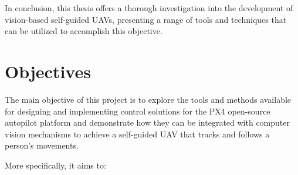 In conclusion, this thesis offers a thorough investigation into the development of vision-based self-guided UAVs, presenting a range of tools and techniques that can be utilized to accomplish this objective.

\section{Objectives}
\label{sec:objetives}

The main objective of this project is to explore the tools and methods available for designing and implementing control solutions for the PX4 open-source autopilot platform and demonstrate how they can be integrated with computer vision mechanisms to achieve a self-guided UAV that tracks and follows a person's movements.

More specifically, it aims to:
